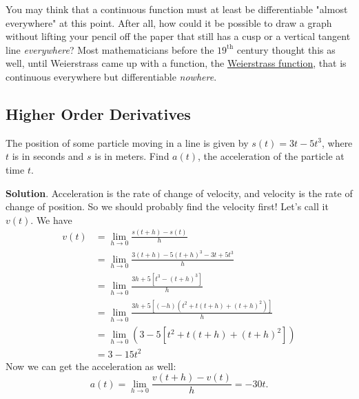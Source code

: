 \documentclass[10pt,]{book}
\theoremstyle{ptxplainnotitle}
\theoremstyle{ptxplaintitle}
\theoremstyle{ptxplainnotitle}
\theoremstyle{ptxplaintitle}
\theoremstyle{ptxplainnotitle}
\theoremstyle{ptxplaintitle}
\theoremstyle{ptxdefinitionnotitle}
\theoremstyle{ptxdefinitiontitle}
\theoremstyle{ptxdefinitionnotitle}
\theoremstyle{ptxdefinitiontitle}
\theoremstyle{ptxdefinitionnotitle}
\theoremstyle{ptxdefinitiontitle}
\theoremstyle{ptxdefinitionnotitle}
\theoremstyle{ptxdefinitiontitle}
\theoremstyle{ptxdefinitionnotitle}
\theoremstyle{ptxdefinitiontitle}
\numberwithin{equation}{section}
\begin{document}
\begin{aside}{}\label{aside-5}
\hypertarget{p-115}{}%
You may think that a continuous function must at least be differentiable "almost everywhere" at this point. After all, how could it be possible to draw a graph without lifting your pencil off the paper that still has a cusp or a vertical tangent line \emph{everywhere}? Most mathematicians before the \(19^{\text{th}}\) century thought this as well, until Weierstrass came up with a function, the \href{https://en.wikipedia.org/wiki/Weierstrass_function}{Weierstrass function}, that is continuous everywhere but differentiable \emph{nowhere}.%
\end{aside}
\typeout{************************************************}
\typeout{************************************************}
\subsection[{Higher Order Derivatives}]{Higher Order Derivatives}\label{subsection-higher-order-derivatives}
\begin{example}\label{example-acceleration-from-position}
\hypertarget{p-116}{}%
The position of some particle moving in a line is given by \(s(t) = 3t-5t^{3}\), where \(t\) is in seconds and \(s\) is in meters. Find \(a(t)\), the acceleration of the particle at time \(t\).%
\par\smallskip%
\noindent\textbf{Solution}.\hypertarget{solution-25}{}\quad%
\hypertarget{p-117}{}%
Acceleration is the rate of change of velocity, and velocity is the rate of change of position. So we should probably find the velocity first! Let's call it \(v(t)\). We have%
\begin{align*}
v(t) & = \lim_{h\to0}\frac{s(t+h) - s(t)}{h} \\
& = \lim_{h\to0}\frac{3(t+h) - 5(t+h)^{3} - 3t + 5t^{3}}{h} \\
& = \lim_{h\to0}\frac{3h + 5[t^{3} - (t+h)^{3}]}{h} \\
& = \lim_{h\to0}\frac{3h + 5[(-h)(t^{2} + t(t+h) + (t+h)^{2})]}{h} \\
& = \lim_{h\to0}(3 - 5[t^{2} + t(t+h) + (t+h)^{2}]) \\
& = 3 - 15t^{2} 
\end{align*}
Now we can get the acceleration as well:%
\begin{equation*}
a(t) = \lim_{h\to0}\frac{v(t+h) - v(t)}{h} = -30t.
\end{equation*}
%
\end{example}
\end{document}
